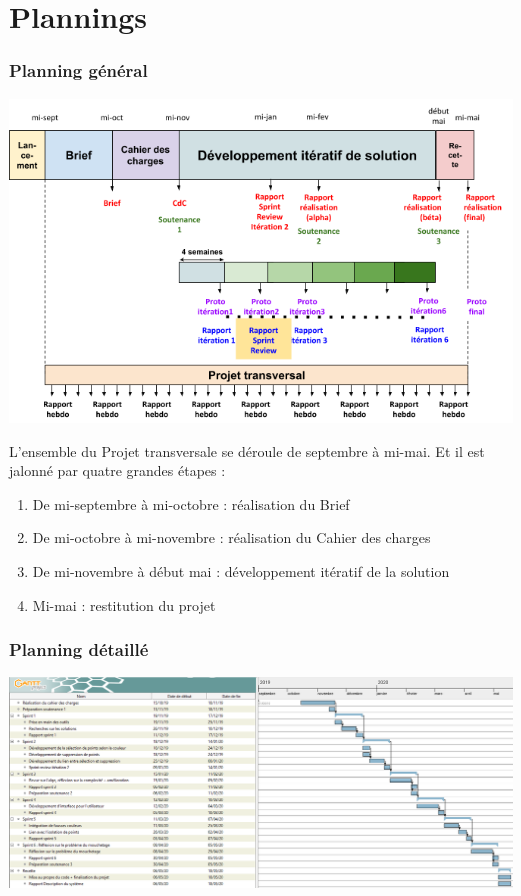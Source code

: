 \documentclass[12pt,titlepage,french]{article}
\begin{document}
\section{Plannings}
\subsubsection*{Planning général}
\begin{center}
\includegraphics[width=\textwidth]{planning.png}
\label{fig:Planning général}
\end{center}
L'ensemble du Projet transversale se déroule de septembre à mi-mai. Et il est jalonné par quatre grandes étapes : 
\begin{enumerate}
\item De mi-septembre à mi-octobre : réalisation du Brief
\item De mi-octobre à mi-novembre : réalisation du Cahier des charges 
\item De mi-novembre à début mai : développement itératif de la solution
\item Mi-mai : restitution du projet
\end{enumerate}

\subsubsection*{Planning détaillé}

\begin{center}
    \includegraphics[scale=0.5,angle=90,origin=c]{gantt.png}
    \label{fig:Planning détaillé}
\end{center}
\end{document}

